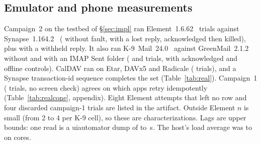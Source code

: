 \subsection{Emulator and phone measurements}
\label{sec:eval-real}
Campaign~2 on the testbed of \S\ref{sec:impl} ran \RealElemN{} Element~1.6.62~\cite{element_android} trials against Synapse~1.164.2~\cite{synapse}
(\RealElemNofaultN{} without fault, \RealElemRL{} with a lost reply, \RealElemAckedN{} acknowledged then killed), plus \RealTimeoutN{} with a withheld reply. It also ran K-9~Mail~24.0~\cite{k9mail}
against GreenMail~2.1.2~\cite{greenmail} without and with an IMAP Sent folder (\RealKnineNosentN{} and \RealKnineSentN{} trials, with acknowledged and offline controls).
CalDAV ran on Etar, DAVx5 and Radicale (\RealCalTrialN{} trials), and a Synapse transaction-id sequence completes the set (Table~\ref{tab:real}).
Campaign~1 (\RealOneN{} trials, no screen check) agrees on which apps retry idempotently (Table~\ref{tab:realcone}, appendix). Eight Element attempts that left no row and four discarded campaign-1 trials are listed in the artifact. Outside Element $n$ is small (from 2 to 4 per K-9 cell), so these are characterizations. Lags are upper bounds:
one read is a uiautomator dump of \RealDumpLo{} to \RealDumpHi\,s. The host's load average was \RealHostLoadLo{} to \RealHostLoadHi{} on \RealHostCores{} cores.



